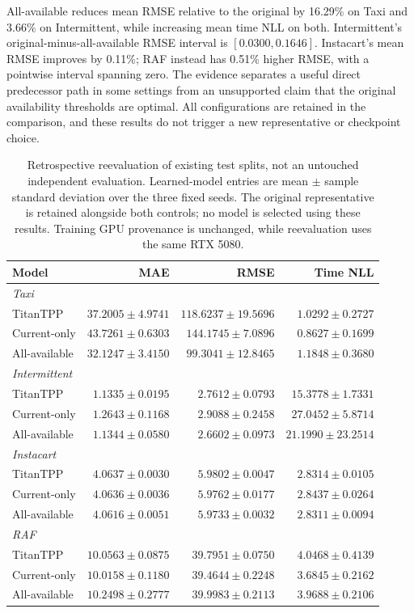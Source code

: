 \documentclass[runningheads]{llncs}
\begin{document}
All-available reduces mean RMSE relative to the original by 16.29\% on
Taxi and 3.66\% on Intermittent, while increasing mean time NLL on both.
Intermittent's original-minus-all-available RMSE interval is
$[0.0300,0.1646]$. Instacart's mean RMSE improves by 0.11\%; RAF instead
has 0.51\% higher RMSE, with a pointwise interval spanning zero.
The evidence separates a useful direct predecessor path in some settings
from an unsupported claim that the original availability thresholds are
optimal. All configurations are retained in the comparison, and these
results do not trigger a new representative or checkpoint choice.

\begin{table}[t]
\centering\small
\caption{Retrospective reevaluation of existing test splits, not an untouched independent evaluation. Learned-model entries are mean $\pm$ sample standard deviation over the three fixed seeds. The original representative is retained alongside both controls; no model is selected using these results. Training GPU provenance is unchanged, while reevaluation uses the same RTX 5080.}
\label{tab:legacy-test-structural}
\begin{tabular}{lrrr}
\toprule
Model & MAE & RMSE & Time NLL \\
\midrule
\multicolumn{4}{l}{\textit{Taxi}}\\
TitanTPP & $37.2005 \pm 4.9741$ & $118.6237 \pm 19.5696$ & $1.0292 \pm 0.2727$ \\
Current-only & $43.7261 \pm 0.6303$ & $144.1745 \pm 7.0896$ & $0.8627 \pm 0.1699$ \\
All-available & $32.1247 \pm 3.4150$ & $99.3041 \pm 12.8465$ & $1.1848 \pm 0.3680$ \\
\midrule
\multicolumn{4}{l}{\textit{Intermittent}}\\
TitanTPP & $1.1335 \pm 0.0195$ & $2.7612 \pm 0.0793$ & $15.3778 \pm 1.7331$ \\
Current-only & $1.2643 \pm 0.1168$ & $2.9088 \pm 0.2458$ & $27.0452 \pm 5.8714$ \\
All-available & $1.1344 \pm 0.0580$ & $2.6602 \pm 0.0973$ & $21.1990 \pm 23.2514$ \\
\midrule
\multicolumn{4}{l}{\textit{Instacart}}\\
TitanTPP & $4.0637 \pm 0.0030$ & $5.9802 \pm 0.0047$ & $2.8314 \pm 0.0105$ \\
Current-only & $4.0636 \pm 0.0036$ & $5.9762 \pm 0.0177$ & $2.8437 \pm 0.0264$ \\
All-available & $4.0616 \pm 0.0051$ & $5.9733 \pm 0.0032$ & $2.8311 \pm 0.0094$ \\
\midrule
\multicolumn{4}{l}{\textit{RAF}}\\
TitanTPP & $10.0563 \pm 0.0875$ & $39.7951 \pm 0.0750$ & $4.0468 \pm 0.4139$ \\
Current-only & $10.0158 \pm 0.1180$ & $39.4644 \pm 0.2248$ & $3.6845 \pm 0.2162$ \\
All-available & $10.2498 \pm 0.2777$ & $39.9983 \pm 0.2113$ & $3.9688 \pm 0.2106$ \\
\bottomrule
\end{tabular}
\end{table}
\end{document}
